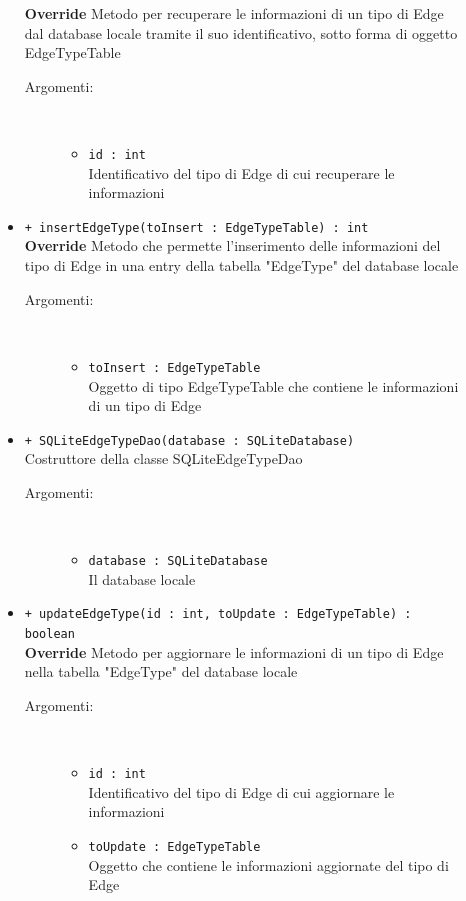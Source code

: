 \documentclass[../DefinizioneDiProdotto.tex]{subfiles}
\begin{document}
\begin{description}
\begin{itemize}
\textbf{Override} Metodo per recuperare le informazioni di un tipo di Edge dal database locale tramite il suo identificativo, sotto forma di oggetto EdgeTypeTable
 \begin{description}
\item[Argomenti:] \
\begin{itemize}
\item \texttt{id : int}\\
Identificativo del tipo di Edge di cui recuperare le informazioni\end{itemize}
\end{description}
\item \texttt{+ insertEdgeType(toInsert : EdgeTypeTable) : int}\\
\textbf{Override} Metodo che permette l'inserimento delle informazioni del tipo di Edge in una entry della tabella "EdgeType" del database locale
 \begin{description}
\item[Argomenti:] \
\begin{itemize}
\item \texttt{toInsert : EdgeTypeTable}\\
Oggetto di tipo EdgeTypeTable che contiene le informazioni di un tipo di Edge\end{itemize}
\end{description}
\item \texttt{+ SQLiteEdgeTypeDao(database : SQLiteDatabase)}\\
Costruttore della classe SQLiteEdgeTypeDao
 \begin{description}
\item[Argomenti:] \
\begin{itemize}
\item \texttt{database : SQLiteDatabase}\\
Il database locale\end{itemize}
\end{description}
\item \texttt{+ updateEdgeType(id : int, toUpdate : EdgeTypeTable) : boolean}\\
\textbf{Override} Metodo per aggiornare le informazioni di un tipo di Edge nella tabella "EdgeType" del database locale
 \begin{description}
\item[Argomenti:] \
\begin{itemize}
\item \texttt{id : int}\\
Identificativo del tipo di Edge di cui aggiornare le informazioni\item \texttt{toUpdate : EdgeTypeTable}\\
Oggetto che contiene le informazioni aggiornate del tipo di Edge\end{itemize}
\end{description}
\end{itemize}
\end{description}
\end{document}
